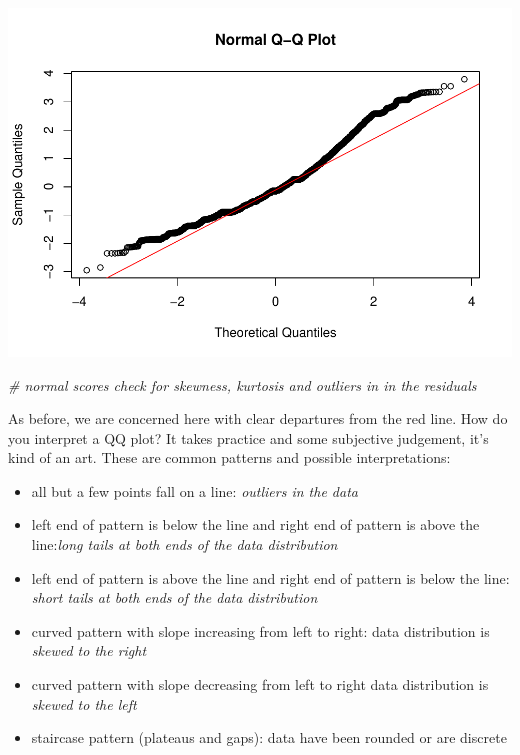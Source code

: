 \documentclass[]{book}
\newenvironment{Shaded}{\begin{snugshade}}{\end{snugshade}}
\newcommand{\CommentTok}[1]{\textcolor[rgb]{0.56,0.35,0.01}{\textit{#1}}}
\theoremstyle{definition}
\theoremstyle{definition}
\theoremstyle{definition}
\theoremstyle{remark}
\begin{document}
\includegraphics{06-hypothesis_testing_files/figure-latex/unnamed-chunk-15-1.pdf}

\begin{Shaded}
\begin{Highlighting}[]
\CommentTok{# normal scores check for skewness, kurtosis and outliers in in the residuals }
\end{Highlighting}
\end{Shaded}

As before, we are concerned here with clear departures from the red
line. How do you interpret a QQ plot? It takes practice and some
subjective judgement, it's kind of an art. These are common patterns and
possible interpretations:

\begin{itemize}
\item
  all but a few points fall on a line: \emph{outliers in the data}
\item
  left end of pattern is below the line and right end of pattern is
  above the line:\emph{long tails at both ends of the data distribution}
\item
  left end of pattern is above the line and right end of pattern is
  below the line: \emph{short tails at both ends of the data
  distribution}
\item
  curved pattern with slope increasing from left to right: data
  distribution is \emph{skewed to the right}
\item
  curved pattern with slope decreasing from left to right data
  distribution is \emph{skewed to the left}
\item
  staircase pattern (plateaus and gaps): data have been rounded or are
  discrete
\end{itemize}
\end{document}
